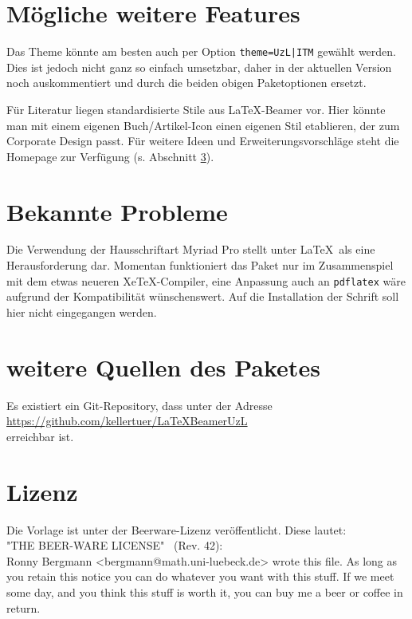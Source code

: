 \documentclass[a4paper,DIV=calc, oneside]{scrartcl}
\begin{document}
\section{Mögliche weitere Features}
Das Theme könnte am besten auch per Option \lstinline!theme=UzL|ITM! gewählt werden. Dies ist jedoch nicht ganz so einfach umsetzbar, daher in der aktuellen Version noch auskommentiert und durch die beiden obigen Paketoptionen ersetzt.

Für Literatur liegen standardisierte Stile aus LaTeX-Beamer vor. Hier könnte man mit einem eigenen Buch/Artikel-Icon einen eigenen Stil etablieren, der zum Corporate Design passt. Für weitere Ideen und Erweiterungsvorschläge steht die Homepage zur Verfügung (s. Abschnitt \ref{sec:HP}).

\section{Bekannte Probleme}
Die Verwendung der Hausschriftart Myriad Pro stellt unter \LaTeX\ als eine Herausforderung dar. Momentan funktioniert das Paket nur im Zusammenspiel mit dem etwas neueren XeTeX-Compiler, eine Anpassung auch an \lstinline!pdflatex! wäre aufgrund der Kompatibilität wünschenswert. Auf die Installation der Schrift soll hier nicht eingegangen werden.
\section{weitere Quellen des Paketes}\label{sec:HP}
Es existiert ein Git-Repository, dass unter der Adresse\\ \href{https://github.com/kellertuer/LaTeXBeamerUzL}{https://github.com/kellertuer/LaTeXBeamerUzL}\\
erreichbar ist.
\section{Lizenz}
Die Vorlage ist unter der Beerware-Lizenz veröffentlicht. Diese lautet:\\[1\baselineskip]
\textrm{"THE BEER-WARE LICENSE" \ (Rev. 42):\\
Ronny Bergmann <bergmann@math.uni-luebeck.de> wrote this file. As long as you retain this notice you
can do whatever you want with this stuff. If we meet some day, and you think 
this stuff is worth it, you can buy me a beer or coffee in return.}
\end{document}
